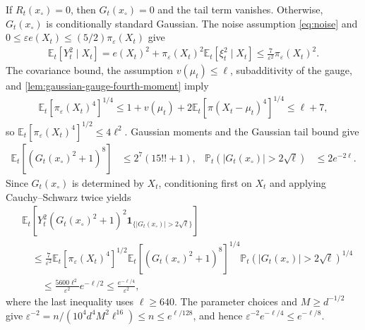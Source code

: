 \documentclass[12pt,cleveref]{jmlr}
\renewenvironment{proof}[1][\proofname]
{\par\noindent{\bfseries\upshape #1\ }}
{\jmlrQED}
\newcommand{\E}{\mathbb E}
\newcommand{\Pp}{\mathbb P}
\newcommand{\1}{\mathbf 1}
\newcommand{\eps}{\varepsilon}
\begin{document}
\begin{proof}
    If $R_t(x_{\circ})=0$, then $G_t(x_{\circ})=0$ and the tail term vanishes.
    Otherwise, $G_t(x_{\circ})$ is conditionally standard Gaussian.
    The noise assumption \cref{eq:noise} and
    $0\leq\eps e(X_t)\leq(5/2)\pi_\eps(X_t)$ give
    \begin{align}
        \E_t[Y_t^2\mid X_t]
        =e(X_t)^2+\pi_\eps(X_t)^2\E_t[\xi_t^2\mid X_t]
        \leq\frac7{\eps^2}\pi_\eps(X_t)^2.
    \end{align}
    The covariance bound, the assumption $v(\mu_t)\leq\ell$, subadditivity of the gauge,
    and \cref{lem:gaussian-gauge-fourth-moment} imply
    \begin{align}
        \E_t[\pi_\eps(X_t)^4]^{1/4}
        \leq1+v(\mu_t)+2\E_t[\pi(X_t-\mu_t)^4]^{1/4}
        \leq\ell+7,
    \end{align}
    so $\E_t[\pi_\eps(X_t)^4]^{1/2}\leq4\ell^2$.
    Gaussian moments and the Gaussian tail bound give
    \begin{align}
        \E_t[(G_t(x_{\circ})^2+1)^8]
        & \leq2^7(15!!+1),
        &
        \Pp_t\left(|G_t(x_{\circ})|>2\sqrt\ell\right)
        & \leq2e^{-2\ell}.
    \end{align}
    Since $G_t(x_{\circ})$ is determined by $X_t$, conditioning first on
    $X_t$ and applying Cauchy--Schwarz twice yields
    \begin{align}
        & \E_t\left[Y_t^2(G_t(x_{\circ})^2+1)^2
        \1_{\{|G_t(x_{\circ})|>2\sqrt\ell\}}\right]
        \nonumber                                         \\
        & \quad\leq\frac7{\eps^2}
        \E_t[\pi_\eps(X_t)^4]^{1/2}
        \E_t[(G_t(x_{\circ})^2+1)^8]^{1/4}
        \Pp_t\left(|G_t(x_{\circ})|>2\sqrt\ell\right)^{1/4}
        \nonumber                                         \\
        & \qquad\leq\frac{5600\ell^2}{\eps^2}e^{-\ell/2}
        \leq\frac{e^{-\ell/4}}{\eps^2},
    \end{align}
    where the last inequality uses $\ell\geq640$.
    The parameter choices and $M\geq d^{-1/2}$ give
    $\eps^{-2}=n/(10^4d^4M^2\ell^{16})\leq n\leq e^{\ell/128}$,
    and hence $\eps^{-2}e^{-\ell/4}\leq e^{-\ell/8}$.
\end{proof}
\end{document}
